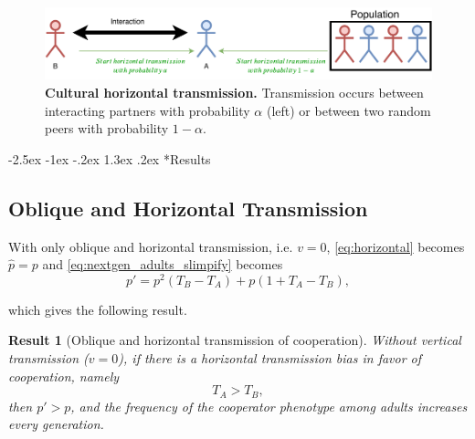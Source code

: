 \documentclass[12pt]{extarticle}
\makeatletter
\renewcommand\section{\@startsection {section}{1}{\z@}%
     {-2.5ex \@plus -1ex \@minus -.2ex}%
     {1.3ex \@plus.2ex}%
    {\Large\bfseries}}
\newtheorem{result}{Result}
\makeatother
\begin{document}
\begin{figure}[thb]
  \centering
  \includegraphics[scale=1]{figure1.pdf}
  \caption{\textbf{Cultural horizontal transmission.} Transmission occurs between interacting partners with probability $\alpha$ (left) or between two random peers with probability $1-\alpha$.}
  \label{fig:horizontal}
\end{figure}


\section*{Results}


\subsection*{Oblique and Horizontal Transmission}

With only oblique and horizontal transmission, i.e. $v = 0$, \autoref{eq:horizontal} becomes $\hat{p}=p$ and \autoref{eq:nextgen_adults_slimpify} becomes %
\begin{equation}  \label{eq:nextgen_parents_oblique_only}
p' = p^2 (T_B-T_A) + p (1+T_A-T_B) ,
\end{equation}

which gives the following result.\\

\begin{result}[Oblique and horizontal transmission of cooperation] \label{result:obli_hori}
Without vertical transmission ($v=0$), if there is a horizontal transmission bias in favor of cooperation, namely
\begin{equation} \label{eq:oblique_only_result}
T_A > T_B, 
\end{equation}
then $p'>p$, and the frequency of the cooperator phenotype among adults increases every generation.
\end{result}
\end{document}
